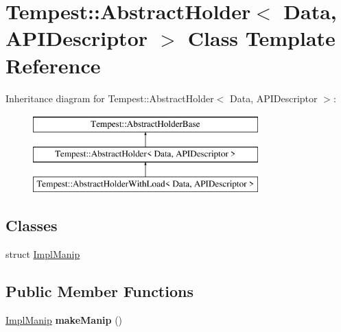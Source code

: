 \hypertarget{class_tempest_1_1_abstract_holder}{\section{Tempest\+:\+:Abstract\+Holder$<$ Data, A\+P\+I\+Descriptor $>$ Class Template Reference}
\label{class_tempest_1_1_abstract_holder}
}
Inheritance diagram for Tempest\+:\+:Abstract\+Holder$<$ Data, A\+P\+I\+Descriptor $>$\+:\begin{figure}[H]
\begin{center}
\leavevmode
\includegraphics[height=3.000000cm]{class_tempest_1_1_abstract_holder}
\end{center}
\end{figure}
\subsection*{Classes}
\begin{DoxyCompactItemize}
\item 
struct \hyperlink{struct_tempest_1_1_abstract_holder_1_1_impl_manip}{Impl\+Manip}
\end{DoxyCompactItemize}
\subsection*{Public Member Functions}
\begin{DoxyCompactItemize}
\item 
\hypertarget{class_tempest_1_1_abstract_holder_a0b726bb7e9ca6096bc6ac65bdd67a861}{\hyperlink{struct_tempest_1_1_abstract_holder_1_1_impl_manip}{Impl\+Manip} {\bfseries make\+Manip} ()}\label{class_tempest_1_1_abstract_holder_a0b726bb7e9ca6096bc6ac65bdd67a861}

\end{DoxyCompactItemize}
